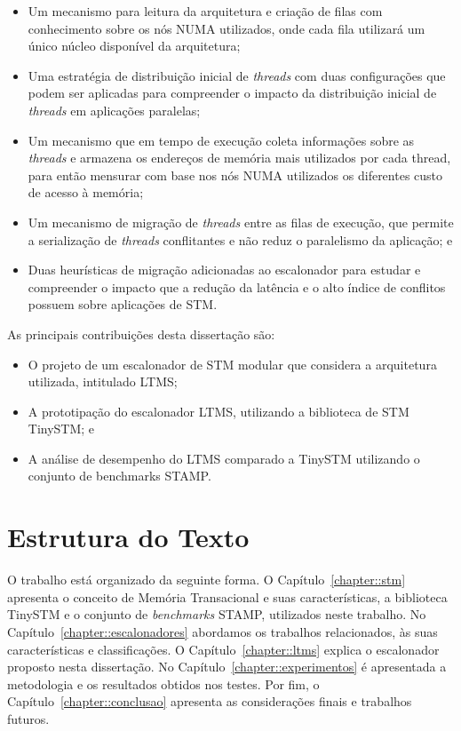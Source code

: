 \documentclass[diss,capa]{texufpel}
\begin{document}
\begin{itemize}
\item Um mecanismo para leitura da arquitetura e criação de filas com conhecimento sobre os nós NUMA utilizados, onde cada fila utilizará um único núcleo disponível da arquitetura;
\item Uma estratégia de distribuição inicial de \emph{threads} com duas configurações que podem ser aplicadas para compreender o impacto da distribuição inicial de \emph{threads} em aplicações paralelas;
\item Um mecanismo que em tempo de execução coleta informações sobre as \emph{threads} e armazena os endereços de memória mais utilizados por cada thread, para então mensurar com base nos nós NUMA utilizados os diferentes custo de acesso à memória;
\item Um mecanismo de migração de \emph{threads} entre as filas de execução, que permite a serialização de \emph{threads} conflitantes e não reduz o paralelismo da aplicação; e
\item Duas heurísticas de migração adicionadas ao escalonador para estudar e compreender o impacto que a redução da latência e o alto índice de conflitos possuem sobre aplicações de STM.
\end{itemize}

As principais contribuições desta dissertação são:

\begin{itemize}
 \item O projeto de um escalonador de STM modular que considera a arquitetura utilizada, intitulado LTMS;
 \item A prototipação do escalonador LTMS, utilizando a biblioteca de STM TinySTM; e
 \item A análise de desempenho do LTMS comparado a TinySTM utilizando o conjunto de benchmarks STAMP.
\end{itemize}

\section{Estrutura do Texto}

O trabalho está organizado da seguinte forma. O Capítulo~\ref{chapter::stm} apresenta o conceito de Memória Transacional e suas características, a biblioteca TinySTM e o conjunto de \emph{benchmarks} STAMP, utilizados neste trabalho. No Capítulo~\ref{chapter::escalonadores} abordamos os trabalhos relacionados, às suas características e classificações. O Capítulo~\ref{chapter::ltms} explica o escalonador proposto nesta dissertação. No Capítulo~\ref{chapter::experimentos} é apresentada a metodologia e os resultados obtidos nos testes. Por fim, o Capítulo~\ref{chapter::conclusao} apresenta as considerações finais e trabalhos futuros.
\end{document}
